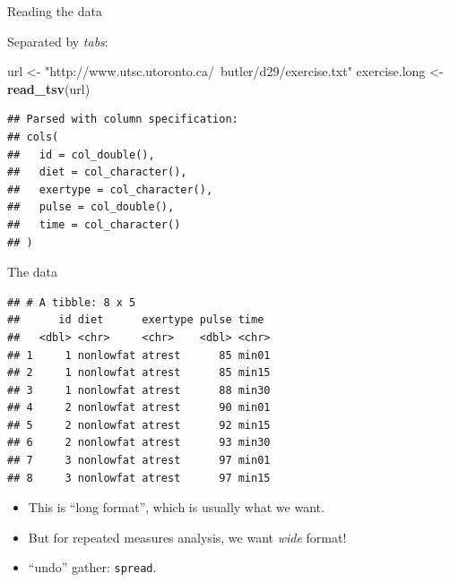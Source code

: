 \documentclass[ignorenonframetext,]{beamer}
\newenvironment{Shaded}{\begin{snugshade}}{\end{snugshade}}
\newcommand{\DecValTok}[1]{\textcolor[rgb]{0.00,0.00,0.81}{#1}}
\newcommand{\KeywordTok}[1]{\textcolor[rgb]{0.13,0.29,0.53}{\textbf{#1}}}
\newcommand{\NormalTok}[1]{#1}
\newcommand{\OperatorTok}[1]{\textcolor[rgb]{0.81,0.36,0.00}{\textbf{#1}}}
\newcommand{\StringTok}[1]{\textcolor[rgb]{0.31,0.60,0.02}{#1}}
\begin{document}
\begin{frame}[fragile]{Reading the data}
\protect\hypertarget{reading-the-data-1}{}

Separated by \emph{tabs}:

\begin{Shaded}
\begin{Highlighting}[]
\NormalTok{url <-}\StringTok{ "http://www.utsc.utoronto.ca/~butler/d29/exercise.txt"}
\NormalTok{exercise.long <-}\StringTok{ }\KeywordTok{read_tsv}\NormalTok{(url)}
\end{Highlighting}
\end{Shaded}

\begin{verbatim}
## Parsed with column specification:
## cols(
##   id = col_double(),
##   diet = col_character(),
##   exertype = col_character(),
##   pulse = col_double(),
##   time = col_character()
## )
\end{verbatim}

\end{frame}

\begin{frame}[fragile]{The data}
\protect\hypertarget{the-data-11}{}

\footnotesize

\begin{Shaded}
\end{Shaded}

\begin{verbatim}
## # A tibble: 8 x 5
##      id diet      exertype pulse time 
##   <dbl> <chr>     <chr>    <dbl> <chr>
## 1     1 nonlowfat atrest      85 min01
## 2     1 nonlowfat atrest      85 min15
## 3     1 nonlowfat atrest      88 min30
## 4     2 nonlowfat atrest      90 min01
## 5     2 nonlowfat atrest      92 min15
## 6     2 nonlowfat atrest      93 min30
## 7     3 nonlowfat atrest      97 min01
## 8     3 nonlowfat atrest      97 min15
\end{verbatim}

\normalsize

\begin{itemize}
\item
  This is ``long format'', which is usually what we want.
\item
  But for repeated measures analysis, we want \emph{wide} format!
\item
  ``undo'' gather: \texttt{spread}.
\end{itemize}

\end{frame}
\end{document}
